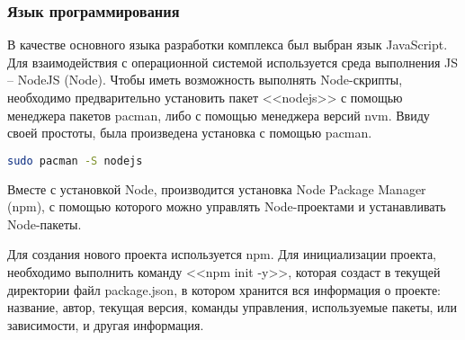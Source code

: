 \subsubsection{Язык программирования}

В качестве основного языка разработки комплекса был выбран язык JavaS\-cript. Для взаимодействия с операционной системой используется среда выполнения JS -- NodeJS (Node). Чтобы иметь возможность выполнять Node-скрипты, необходимо предварительно установить пакет <<nodejs>> с помощью менеджера пакетов pacman, либо с помощью менеджера версий nvm. Ввиду своей простоты, была произведена установка с помощью pacman.

\begin{lstlisting}[style=ES6, language=bash]
  sudo pacman -S nodejs
\end{lstlisting}

Вместе с установкой Node, производится установка Node Package Manager (npm), с помощью которого можно управлять Node-проектами и устанавливать Node-пакеты.

Для создания нового проекта используется npm. Для инициализации проекта, необходимо выполнить команду <<npm init -y>>, которая создаст в текущей директории файл package.json, в котором хранится вся информация о проекте: название, автор, текущая версия, команды управления, используемые пакеты, или зависимости, и другая информация.